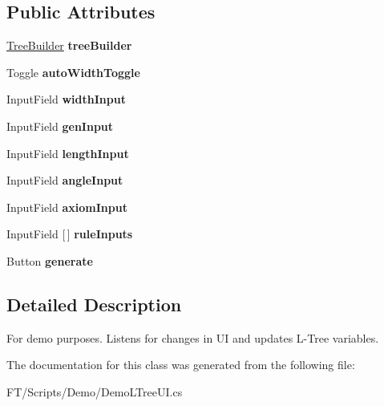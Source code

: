 \subsection*{Public Attributes}
\begin{DoxyCompactItemize}
\item 
\mbox{\label{class_fractal_tree_1_1_demo_1_1_demo_l_tree_u_i_a29954afb766fe5ef22708acfed0406be}} 
\hyperlink{class_fractal_tree_1_1_tree_builder}{Tree\+Builder} {\bfseries tree\+Builder}
\item 
\mbox{\label{class_fractal_tree_1_1_demo_1_1_demo_l_tree_u_i_a35095cdc2d943f10eebf668a8c89792f}} 
Toggle {\bfseries auto\+Width\+Toggle}
\item 
\mbox{\label{class_fractal_tree_1_1_demo_1_1_demo_l_tree_u_i_a8337c29e68c73a086eeff4fd5ceb678e}} 
Input\+Field {\bfseries width\+Input}
\item 
\mbox{\label{class_fractal_tree_1_1_demo_1_1_demo_l_tree_u_i_aab8a985a8a1f32dab8ba8a764d4b1456}} 
Input\+Field {\bfseries gen\+Input}
\item 
\mbox{\label{class_fractal_tree_1_1_demo_1_1_demo_l_tree_u_i_afdb15881135d26460fe1312aa42df550}} 
Input\+Field {\bfseries length\+Input}
\item 
\mbox{\label{class_fractal_tree_1_1_demo_1_1_demo_l_tree_u_i_af3631be21ca9d41a4bbdf969f04a458c}} 
Input\+Field {\bfseries angle\+Input}
\item 
\mbox{\label{class_fractal_tree_1_1_demo_1_1_demo_l_tree_u_i_af6fcf8dae21063a705eac204483d0208}} 
Input\+Field {\bfseries axiom\+Input}
\item 
\mbox{\label{class_fractal_tree_1_1_demo_1_1_demo_l_tree_u_i_a27f93ea90e35205c11a963d68f7696d6}} 
Input\+Field \mbox{[}$\,$\mbox{]} {\bfseries rule\+Inputs}
\item 
\mbox{\label{class_fractal_tree_1_1_demo_1_1_demo_l_tree_u_i_a0c71d7d0387e939fb5fa7ad9db2dae2c}} 
Button {\bfseries generate}
\end{DoxyCompactItemize}


\subsection{Detailed Description}
For demo purposes. Listens for changes in UI and updates L-\/\+Tree variables. 



The documentation for this class was generated from the following file\+:\begin{DoxyCompactItemize}
\item 
F\+T/\+Scripts/\+Demo/Demo\+L\+Tree\+U\+I.\+cs\end{DoxyCompactItemize}
